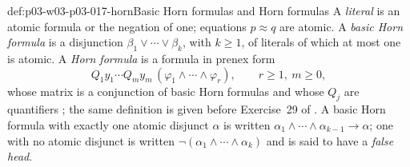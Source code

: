\begin{hbdefinition}{def:p03-w03-p03-017-horn}{Basic Horn formulas and Horn formulas}
A \emph{literal} is an atomic formula or the negation of one; equations
\(p\approx q\) are atomic.  A \emph{basic Horn formula} is a disjunction
\(\beta_1\vee\cdots\vee\beta_k\), with \(k\ge1\), of literals of which at
most one is atomic.  A \emph{Horn formula} is a formula in prenex form
\[
  Q_1y_1\cdots Q_my_m\,(\varphi_1\wedge\cdots\wedge\varphi_r),
  \qquad r\ge1,\ m\ge0,
\]
whose matrix is a conjunction of basic Horn formulas and whose
\(Q_j\) are quantifiers
\cite[V\S2, Definition~2.5, p.~207]{BurrisSankappanavar2012}; the same
definition is given before Exercise~29 of
\cite[V\S1, p.~204]{BurrisSankappanavar2012}.  A basic Horn formula with
exactly one atomic disjunct \(\alpha\) is written
\(\alpha_1\wedge\cdots\wedge\alpha_{k-1}\to\alpha\); one with no atomic
disjunct is written \(\neg(\alpha_1\wedge\cdots\wedge\alpha_k)\) and is said
to have a \emph{false head}.
\end{hbdefinition}

